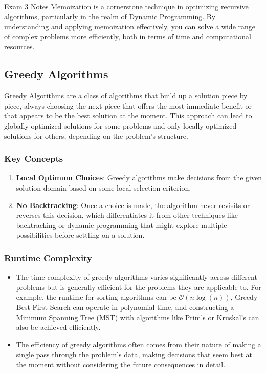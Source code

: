 \begin{examnotes}{Exam 3 Notes}
    Memoization is a cornerstone technique in optimizing recursive algorithms, particularly in the realm of Dynamic Programming. By understanding and applying memoization effectively, you can solve a 
    wide range of complex problems more efficiently, both in terms of time and computational resources.

    \subsection*{Greedy Algorithms}

    Greedy Algorithms are a class of algorithms that build up a solution piece by piece, always choosing the next piece that offers the most immediate benefit or that appears to be the best solution 
    at the moment. This approach can lead to globally optimized solutions for some problems and only locally optimized solutions for others, depending on the problem's structure.

    \subsubsection*{Key Concepts}

    \begin{enumerate}
        \item \textbf{Local Optimum Choices}: Greedy algorithms make decisions from the given solution domain based on some local selection criterion.
        \item \textbf{No Backtracking}: Once a choice is made, the algorithm never revisits or reverses this decision, which differentiates it from other techniques like backtracking or dynamic 
        programming that might explore multiple possibilities before settling on a solution.
    \end{enumerate}

    \subsubsection*{Runtime Complexity}

    \begin{itemize}
        \item The time complexity of greedy algorithms varies significantly across different problems but is generally efficient for the problems they are applicable to. For example, the runtime for 
        sorting algorithms can be $\mathcal{O}(n\log{(n)})$, Greedy Best First Search can operate in polynomial time, and constructing a Minimum Spanning Tree (MST) with algorithms like Prim's or 
        Kruskal's can also be achieved efficiently.
        \item The efficiency of greedy algorithms often comes from their nature of making a single pass through the problem's data, making decisions that seem best at the moment without considering 
        the future consequences in detail.
    \end{itemize}


\end{examnotes}
